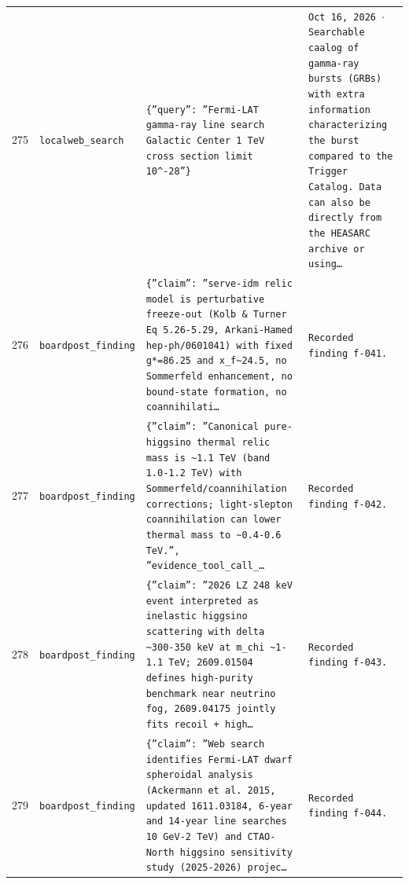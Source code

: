 \documentclass[11pt,a4paper]{article}
\begin{document}
\begin{longtable}{@{}p{}p{}p{}p{}@{}}
275 & \texttt{local}\newline\texttt{web\_\allowbreak{}search} & \texttt{\{''query'':\allowbreak{} ''Fermi-LAT gamma-ray line search Galactic Center 1 TeV cross section limit 10\textasciicircum{}\allowbreak{}-28''\}\allowbreak{}} & \texttt{Oct 16,\allowbreak{} 2026 $\cdot$ Searchable caalog of gamma-ray bursts (GRBs)\allowbreak{} with extra information characterizing the burst compared to the Trigger Catalog. Data can also be directly from the HEASARC archive or using\ldots{}\allowbreak{}} \\
276 & \texttt{board}\newline\texttt{post\_\allowbreak{}finding} & \texttt{\{''claim'':\allowbreak{} ''serve-idm relic model is perturbative freeze-out (Kolb \& Turner Eq 5.26-5.29,\allowbreak{} Arkani-Hamed hep-ph/\allowbreak{}0601041)\allowbreak{} with fixed g*=\allowbreak{}86.25 and x\_\allowbreak{}f\textasciitilde{}\allowbreak{}24.5,\allowbreak{} no Sommerfeld enhancement,\allowbreak{} no bound-state formation,\allowbreak{} no coannihilati\ldots{}\allowbreak{}} & \texttt{Recorded finding f-041.} \\
277 & \texttt{board}\newline\texttt{post\_\allowbreak{}finding} & \texttt{\{''claim'':\allowbreak{} ''Canonical pure-higgsino thermal relic mass is \textasciitilde{}\allowbreak{}1.1 TeV (band 1.0-1.2 TeV)\allowbreak{} with Sommerfeld/\allowbreak{}coannihilation corrections;\allowbreak{} light-slepton coannihilation can lower thermal mass to \textasciitilde{}\allowbreak{}0.4-0.6 TeV.'',\allowbreak{} ''evidence\_\allowbreak{}tool\_\allowbreak{}call\_\allowbreak{}\ldots{}\allowbreak{}} & \texttt{Recorded finding f-042.} \\
278 & \texttt{board}\newline\texttt{post\_\allowbreak{}finding} & \texttt{\{''claim'':\allowbreak{} ''2026 LZ 248 keV event interpreted as inelastic higgsino scattering with delta \textasciitilde{}\allowbreak{}300-350 keV at m\_\allowbreak{}chi \textasciitilde{}\allowbreak{}1-1.1 TeV;\allowbreak{} 2609.01504 defines high-purity benchmark near neutrino fog,\allowbreak{} 2609.04175 jointly fits recoil + high\ldots{}\allowbreak{}} & \texttt{Recorded finding f-043.} \\
279 & \texttt{board}\newline\texttt{post\_\allowbreak{}finding} & \texttt{\{''claim'':\allowbreak{} ''Web search identifies Fermi-LAT dwarf spheroidal analysis (Ackermann et al. 2015,\allowbreak{} updated 1611.03184,\allowbreak{} 6-year and 14-year line searches 10 GeV-2 TeV)\allowbreak{} and CTAO-North higgsino sensitivity study (2025-2026)\allowbreak{} projec\ldots{}\allowbreak{}} & \texttt{Recorded finding f-044.} \\

\end{longtable}
\end{document}

